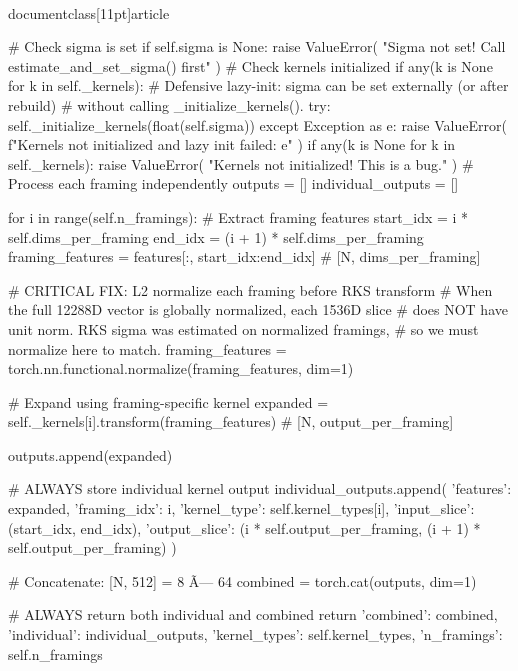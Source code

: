 \\documentclass[11pt]{article}
\begin{document}
\begin{CodeBlock}
        # Check sigma is set
        if self.sigma is None:
            raise ValueError(
                "Sigma not set! Call estimate_and_set_sigma() first"
            )
        # Check kernels initialized
        if any(k is None for k in self._kernels):
            # Defensive lazy-init: sigma can be set externally (or after rebuild)
            # without calling _initialize_kernels().
            try:
                self._initialize_kernels(float(self.sigma))
            except Exception as e:
                raise ValueError(
                    f"Kernels not initialized and lazy init failed: {e}"
                )
        if any(k is None for k in self._kernels):
            raise ValueError(
                "Kernels not initialized! This is a bug."
            )
# Process each framing independently
        outputs = []
        individual_outputs = []
        
        for i in range(self.n_framings):
            # Extract framing features
            start_idx = i * self.dims_per_framing
            end_idx = (i + 1) * self.dims_per_framing
            framing_features = features[:, start_idx:end_idx]  # [N, dims_per_framing]

            # CRITICAL FIX: L2 normalize each framing before RKS transform
            # When the full 12288D vector is globally normalized, each 1536D slice
            # does NOT have unit norm. RKS sigma was estimated on normalized framings,
            # so we must normalize here to match.
            framing_features = torch.nn.functional.normalize(framing_features, dim=1)

            # Expand using framing-specific kernel
            expanded = self._kernels[i].transform(framing_features)  # [N, output_per_framing]
            
            outputs.append(expanded)
            
            # ALWAYS store individual kernel output
            individual_outputs.append({
                'features': expanded,
                'framing_idx': i,
                'kernel_type': self.kernel_types[i],
                'input_slice': (start_idx, end_idx),
                'output_slice': (i * self.output_per_framing, (i + 1) * self.output_per_framing)
            })
        
        # Concatenate: [N, 512] = 8 Ã— 64
        combined = torch.cat(outputs, dim=1)
        
        # ALWAYS return both individual and combined
        return {
            'combined': combined,
            'individual': individual_outputs,
            'kernel_types': self.kernel_types,
            'n_framings': self.n_framings
        }
    

\end{CodeBlock}
\end{document}
